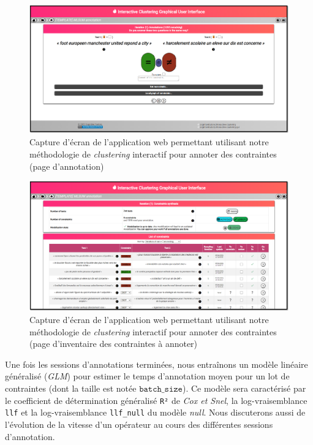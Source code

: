 			\begin{figure}[!htb]
				\centering
				\includegraphics[width=\textwidth]{figures/etude-temps-annotation-0application-annotation}
				\caption{Capture d'écran de l'application web permettant utilisant notre méthodologie de \textit{clustering} interactif pour annoter des contraintes (page d'annotation)}
				\label{figure:4.3.1-ETUDE-COUTS-TEMPS-ANNOTATION-APPLICATION-ANNOTATION}
			\end{figure}
			\begin{figure}[!htb]
				\centering
				\includegraphics[width=\textwidth]{figures/etude-temps-annotation-0application-liste-contraintes}
				\caption{Capture d'écran de l'application web permettant utilisant notre méthodologie de \textit{clustering} interactif pour annoter des contraintes (page d'inventaire des contraintes à annoter)}
				\label{figure:4.3.1-ETUDE-COUTS-TEMPS-ANNOTATION-APPLICATION-LISTE-CONTRAINTES}
			\end{figure}
			
			
			Une fois les sessions d'annotations terminées, nous entraînons un modèle linéaire généralisé (\textit{GLM}) pour estimer le temps d'annotation moyen pour un lot de contraintes (dont la taille est notée $\texttt{batch\_size}$).
			Ce modèle sera caractérisé par le coefficient de détermination généralisé \texttt{R²} de \textit{Cox et Snel}, la log-vraisemblance \texttt{llf} et la log-vraisemblance \texttt{llf\_null} du modèle \textit{null}.
			Nous discuterons aussi de l'évolution de la vitesse d'un opérateur au cours des différentes sessions d'annotation.

